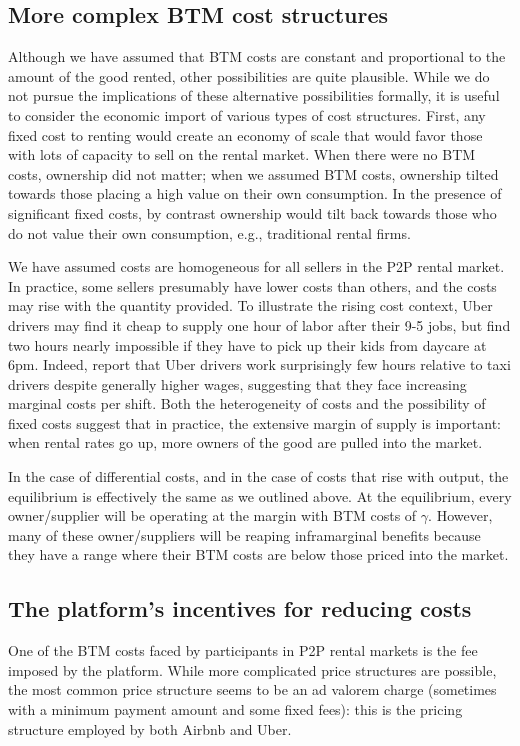 \documentclass[12pt]{article}
\begin{document}
\subsection{More complex BTM cost structures}
Although we have assumed that BTM costs are constant and proportional to the amount of the good rented, other possibilities are quite plausible.
While we do not pursue the implications of these alternative possibilities formally, it is useful to consider the economic import of various types of cost structures.
First, any fixed cost to renting would create an economy of scale that would favor those with lots of capacity to sell on the rental market.
When there were no BTM costs, ownership did not matter;
when we assumed BTM costs, ownership tilted towards those placing a high value on their own consumption.
In the presence of significant fixed costs, by contrast ownership would tilt back towards those who do not value their own consumption, e.g., traditional rental firms. 

We have assumed costs are homogeneous for all sellers in the P2P rental market.
In practice, some sellers presumably have lower costs than others, and the costs may rise with the quantity provided. 
To illustrate the rising cost context, Uber drivers may find it cheap to supply one hour of labor after their 9-5 jobs, but find two hours nearly impossible if they have to pick up their kids from daycare at 6pm.  
Indeed, \cite{hall2015analysis} report that Uber drivers work surprisingly few hours relative to taxi drivers despite generally higher wages, suggesting that they face increasing marginal costs per shift. 
Both the heterogeneity of costs and the possibility of fixed costs suggest that in practice, the extensive margin of supply is important:
when rental rates go up, more owners of the good are pulled into the market. 

In the case of differential costs, and in the case of costs that rise with output, the equilibrium is effectively the same as we outlined above.
At the equilibrium, every owner/supplier will be operating at the margin with BTM costs of $\gamma$.
However, many of these owner/suppliers will be reaping inframarginal benefits because they have a range where their BTM costs are below those priced into the market. 

\subsection{The platform's incentives for reducing costs}
One of the BTM costs faced by participants in P2P rental markets is the fee imposed by the platform.
While more complicated price structures are possible, the most common price structure seems to be an ad valorem charge (sometimes with a minimum payment amount and some fixed fees):
this is the pricing structure employed by both Airbnb and Uber.
\end{document}
